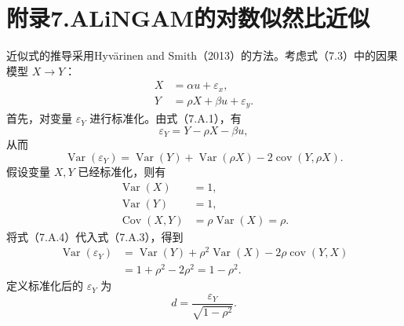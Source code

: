 \section*{附录7.A\quad LiNGAM的对数似然比近似}

近似式的推导采用Hyvärinen and Smith（2013）的方法。考虑式（7.3）中的因果模型 $X\to Y$：
\begin{equation}
\begin{aligned}
X&=\alpha u+\varepsilon_x,\\
Y&=\rho X+\beta u+\varepsilon_y.
\end{aligned}\tag{7.A.1}
\end{equation}
首先，对变量 $\varepsilon_Y$ 进行标准化。由式（7.A.1），有
\begin{equation}
\varepsilon_Y=Y-\rho X-\beta u,\tag{7.A.2}
\end{equation}
从而
\begin{equation}
\operatorname{Var}(\varepsilon_Y)=\operatorname{Var}(Y)
 +\operatorname{Var}(\rho X)-2\operatorname{cov}(Y,\rho X).\tag{7.A.3}
\end{equation}
假设变量 $X,Y$ 已经标准化，则有
\begin{equation}
\begin{aligned}
\operatorname{Var}(X)&=1,\\
\operatorname{Var}(Y)&=1,\\
\operatorname{Cov}(X,Y)&=\rho\operatorname{Var}(X)=\rho.
\end{aligned}\tag{7.A.4}
\end{equation}
将式（7.A.4）代入式（7.A.3），得到
\begin{equation}
\begin{aligned}
\operatorname{Var}(\varepsilon_Y)
 &=\operatorname{Var}(Y)+\rho^2\operatorname{Var}(X)
   -2\rho\operatorname{cov}(Y,X)\\
 &=1+\rho^2-2\rho^2=1-\rho^2.
\end{aligned}\tag{7.A.5}
\end{equation}
定义标准化后的 $\varepsilon_Y$ 为
\begin{equation}
d=\frac{\varepsilon_Y}{\sqrt{1-\rho^2}}.\tag{7.A.6}
\end{equation}


